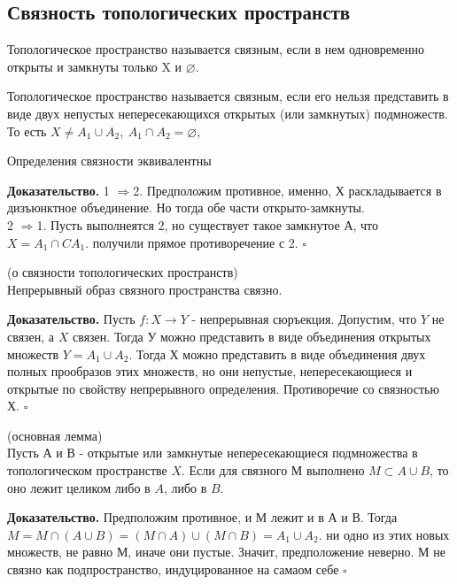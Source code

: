 \subsection{Связность топологических пространств}
\begin{defin}
Топологическое пространство называется связным, если в нем одновременно 
открыты и замкнуты только X и $\varnothing$.
\end{defin}
\begin{defin}
Топологическое пространство называется связным, если его нельзя представить
в виде двух непустых непересекающихся открытых (или замкнутых) подмножеств.
То есть $X\ne A_1\cup A_2,~A_1\cap A_2=\varnothing,$
\end{defin}
\begin{theor}
 Определения связности эквивалентны
\end{theor}
\textbf{Доказательство.} 1 $\Rightarrow$2. Предположим противное, именно, 
Х раскладывается в дизъюнктное объединение. Но тогда обе части 
открыто-замкнуты. \\
2 $\Rightarrow$1. Пусть выполнеятся 2, но существует такое замкнутое А, что 
$X=A_1\cap CA_1$. получили прямое противоречение с 2.
$\square$ 
\begin{theor}
    (о связности топологических пространств)\\
    Непрерывный образ связного пространства связно.
\end{theor}
\textbf{Доказательство.} Пусть $f\colon X\to Y$ -  непрерывная сюръекция. 
Допустим, что $Y$ не связен, а  $X$ связен. Тогда У можно
представить в виде объединения открытых множеств $Y=A_1\cup A_2$.  
Тогда Х можно представить в виде объединения двух полных прообразов этих
множеств,
но они непустые, непересекающиеся и открытые по свойству непрерывного 
определения. Противоречие со связностью Х.
$\square$ \\
\begin{theor}
    (основная лемма)\\
    Пусть А и В - открытые или замкнутые непересекающиеся подмножества в
    топологическом пространстве $X$. Если для связного М выполнено
    $M\subset A\cup B$, то оно лежит целиком либо в $A$, либо в $B$.
\end{theor}
\textbf{Доказательство.}  Предположим противное, и М лежит и в А и В.
Тогда $M=M\cap(A\cup B)=(M\cap A)\cup(M\cap B)=A_1\cup A_2$. ни одно из 
этих новых множеств, не равно М, иначе они пустые. Значит, предположение 
неверно. М не связно как подпространство, индуцированное на самаом себе
$\square$ 
